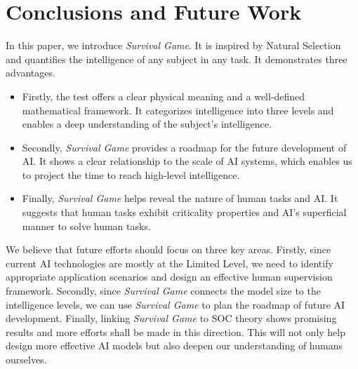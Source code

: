 \section{Conclusions and Future Work}
\label{sec:conclusion}

In this paper, we introduce \textit{Survival Game}. It is inspired by Natural Selection and quantifies the intelligence of any subject in any task. It demonstrates three advantages.
\begin{itemize}
	\item Firstly, the test offers a clear physical meaning and a well-defined mathematical framework. It categorizes intelligence into three levels and enables a deep understanding of the subject's intelligence. 
	\item Secondly, \textit{Survival Game} provides a roadmap for the future development of AI. It shows a clear relationship to the scale of AI systems, which enables us to project the time to reach high-level intelligence.
	\item Finally, \textit{Survival Game} helps reveal the nature of human tasks and AI. It suggests that human tasks exhibit criticality properties and AI's superficial manner to solve human tasks. 
\end{itemize}


We believe that future efforts should focus on three key areas.
Firstly, since current AI technologies are mostly at the Limited Level, we need to identify appropriate application scenarios and design an effective human supervision framework.
Secondly, since \textit{Survival Game} connects the model size to the intelligence levels, we can use \textit{Survival Game} to plan the roadmap of future AI development. 
Finally, linking \textit{Survival Game} to SOC theory shows promising results and more efforts shall be made in this direction. This will not only help design more effective AI models but also deepen our understanding of humans ourselves.



